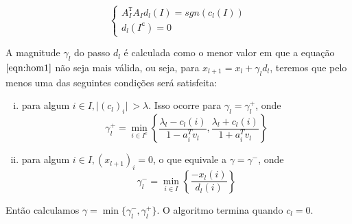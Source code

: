 \begin{equation}
\begin{cases}
A^{\texttt{T}}_I A_I d_l(I) = sgn (c_l(I)) \\
d_l(I^{\texttt{c}}) = 0
\end{cases}
\label{eqn:hom2}
\end{equation}

A magnitude $\gamma_l$ do passo $d_l$ é calculada como o menor valor em que a equação $\eqref{eqn:hom1}$ não seja mais válida, ou seja, para $x_{l+1} = x_{l} + \gamma_l d_l$, teremos que pelo menos uma das seguintes condições será satisfeita:

\begin{enumerate}[(i)]
\item para algum $i \in I, \vert (c_l)_i \vert \ > \lambda$. Isso ocorre para $\gamma_l = \gamma_l^{+}$, onde
$$ \gamma_l^{+} = \min_{i \in I^c} \left\lbrace \frac{\lambda_l - c_l(i)}{1 - a_i^T v_l}, \frac{\lambda_l + c_l(i)}{1 + a_i^T v_l} \right\rbrace$$

\item para algum $i \in I, (x_{l+1})_i = 0$, o que equivale a $\gamma = \gamma^{-}$, onde
$$ \gamma_l^{-} = \min_{i \in I} \left\lbrace \frac{- x_l(i)}{d_l(i)} \right\rbrace$$
\end{enumerate}

Então calculamos $\gamma = \min \lbrace \gamma_l^{-}, \gamma_l^{+} \rbrace$. O algoritmo termina quando $c_l = 0$.